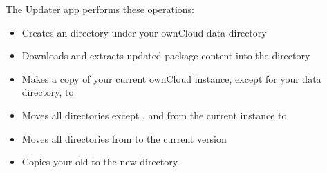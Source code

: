 \documentclass[letterpaper,10pt,english]{sphinxmanual}
\begin{document}
The Updater app performs these operations:
\begin{itemize}
\item {} 
Creates an  directory under your ownCloud data directory

\item {} 
Downloads and extracts updated package content into the
 directory

\item {} 
Makes a copy of your current ownCloud instance, except for your data
directory, to 

\item {} 
Moves all directories except ,  and  from the
current instance to 

\item {} 
Moves all directories from  to the current
version

\item {} 
Copies your old  to the new  directory

\end{itemize}
\end{document}
